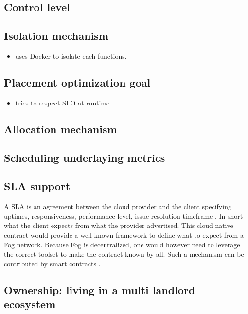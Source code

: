 \documentclass[11pt]{sdm}
\begin{document}
\subsection{Control level}

\subsection{Isolation mechanism}
\begin{itemize}
    \item \cite{cheng_fog_2019} uses Docker to isolate each functions.
\end{itemize}

\subsection{Placement optimization goal}
\begin{itemize}
    \item \cite{cheng_fog_2019} tries to respect \gls{SLO} at runtime
\end{itemize}

\subsection{Allocation mechanism}
\subsection{Scheduling underlaying metrics}

\hypersetup{linkcolor=}
\subsection{\acrfull{SLA} support}
A \acrfull{SLA} is an agreement between the cloud provider and the client specifying uptimes, responsiveness, performance-level, issue resolution timeframe \cite{wikipedia_service-level_2021}. In short what the client expects from what the provider advertised. This cloud native contract would provide a well-known framework to define what to expect from a Fog network. Because Fog is decentralized, one would however need to leverage the correct toolset to make the contract known by all. Such a mechanism can be contributed by smart contracts \cite{hang_sla-based_2019, di_pascale_smart_2017, zhou_trustworthy_2018}.
\subsection{Ownership: living in a multi landlord ecosystem}
\end{document}
